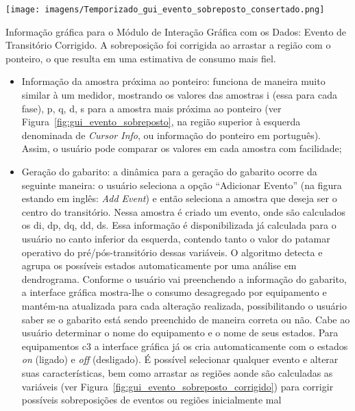\begin{SidewaysFigure}
\texttt{[image: imagens/Temporizado\_gui\_evento\_sobreposto\_consertado.png]}
\caption[Informação gráfica para o Módulo de Interação Gráfica com os
Dados: Evento de Transitório Corrigido.]{
Informação gráfica para o Módulo de Interação Gráfica com os
Dados: Evento de Transitório Corrigido. A sobreposição foi corrigida
ao arrastar a região com o ponteiro, o que resulta em uma
estimativa de consumo mais fiel.}
\label{fig:gui_evento_sobreposto_corrigido}
\end{SidewaysFigure}

\begin{itemize}
\item Informação da amostra próxima ao ponteiro: funciona de maneira
muito similar à um medidor, mostrando os valores das amostras \acs{i}
(essa para cada fase), \acs{p}, \acs{q}, \acs{d}, \acs{s} para a
amostra mais próxima ao ponteiro (ver
Figura~\ref{fig:gui_evento_sobreposto}, na região superior à esquerda
denominada de \emph{Cursor Info}, ou informação do ponteiro em
português). Assim, o usuário pode comparar os
valores em cada amostra com facilidade;
\item Geração do gabarito: a dinâmica para a geração do gabarito
ocorre da seguinte maneira: o usuário
seleciona a opção ``Adicionar Evento'' (na figura estando em inglês:
\emph{Add Event}) e então seleciona a amostra que deseja ser o centro
do transitório. Nessa amostra é criado um evento, onde são calculados
os \acs{di}, \acs{dp}, \acs{dq}, \acs{dd}, \acs{ds}. Essa informação é
disponibilizada já calculada para o usuário no canto inferior da
esquerda, contendo tanto o valor do patamar operativo do
pré/pós-transitório dessas variáveis. O algoritmo
detecta e agrupa os possíveis estados automaticamente por uma análise
em dendrograma. Conforme o usuário vai preenchendo a informação do
gabarito, a interface gráfica mostra-lhe o consumo desagregado por
equipamento e mantém-na atualizada para cada alteração realizada,
possibilitando o usuário saber se o gabarito está sendo preenchido de
maneira correta ou não. Cabe ao usuário determinar o nome do equipamento
e o nome de seus estados. Para equipamentos \acs{c3} a interface gráfica
já os cria automaticamente com o estados \emph{on} (ligado) e
\emph{off} (desligado). É possível selecionar qualquer evento e
alterar suas características, bem como arrastar as regiões aonde são
calculadas as variáveis (ver
Figura~\ref{fig:gui_evento_sobreposto_corrigido}) para corrigir
possíveis sobreposições de eventos ou regiões inicialmente mal

\end{itemize}
